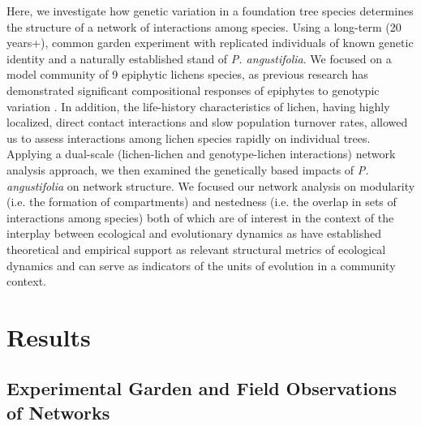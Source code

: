 \documentclass[fleqn,10pt]{wlscirep}
\begin{document}
Here, we investigate how genetic variation in a foundation tree
species determines the structure of a network of interactions among
species. Using a long-term (20 years+), common garden experiment with
replicated individuals of known genetic identity and a naturally
established stand of \textit{P. angustifolia}. We focused on a model
community of 9 epiphytic lichens species, as previous research has
demonstrated significant compositional responses of epiphytes to
genotypic variation \cite{Winfree2011, Zytynska2011}. In addition, the
life-history characteristics of lichen, having highly localized,
direct contact interactions and slow population turnover rates,
allowed us to assess interactions among lichen species rapidly on
individual trees. Applying a dual-scale (lichen-lichen and
genotype-lichen interactions) network analysis approach, we then
examined the genetically based impacts of \textit{P. angustifolia} on
network structure. We focused our network analysis on modularity
(i.e. the formation of compartments) and nestedness (i.e. the overlap
in sets of interactions among species) both of which are of interest
in the context of the interplay between ecological and evolutionary
dynamics as have established theoretical and empirical support as
relevant structural metrics of ecological dynamics and can serve as
indicators of the units of evolution in a community context.




\section*{Results}


\subsection*{Experimental Garden and Field Observations of Networks}
\end{document}
